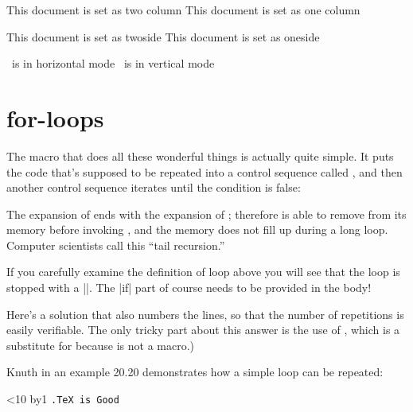 \begin{teX}
\ifthenelse{\@twocolumn}
   {This document is set as two column}
   {This document is set as one column}

\ifthenelse{\@twoside}
   {This document is set as twoside}
   {This document is set as oneside}

\ifthenelse{\hmode}
   {\tex\  is in horizontal mode}
   {\tex\  is in vertical mode}
\end{teX}



\section{for-loops}

The  macro that does all these wonderful things is actually quite simple.
It puts the code that's supposed to be repeated into a control sequence called
, and then another control sequence iterates until the condition is false:

\begin{teX}
\def\loop#1\repeat{\def\body{#1}\iterate}
\def\iterate{\body\let\next=\iterate\else\let\next=\relax\fi\next}
\end{teX}



The expansion of  ends with the expansion of ; therefore \tex is able
to remove  from its memory before invoking , and the memory does not
fill up during a long loop. Computer scientists call this ``tail recursion.''

If you carefully examine the definition of loop above you will see that the loop is stopped with a |\relax\fi|. The |if| part of course needs to be provided in the body!


Here's a solution that also numbers the lines, so that the number of repetitions
is easily verifiable. The only tricky part about this answer is the use of , which
is a substitute for  because  is not a  macro.)

Knuth in an example 20.20 demonstrates how a simple loop can be repeated:

\begin{teX}
\newcount\n
\def\punishment#1#2{\n=0
    \loop\ifnum\n<#2 \advance\n by1
         {\tt {\number\n.}#1\endgraf}\repeat}
    \punishment{TeX is Good}{10}
\end{teX}

